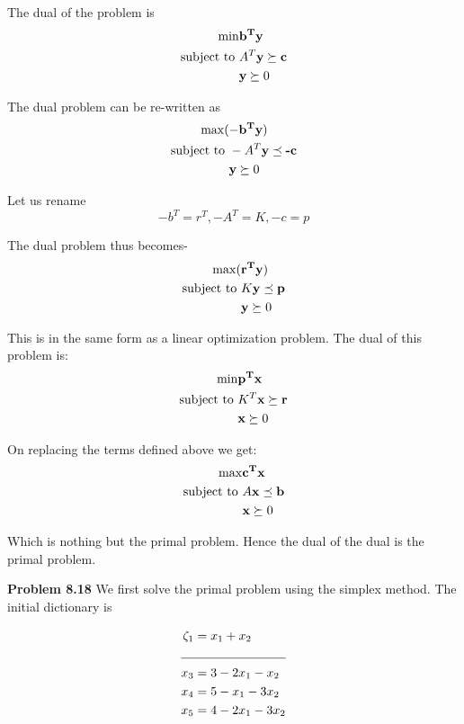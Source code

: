 \documentclass[letterpaper,12pt]{article}
\theoremstyle{definition}
\begin{document}
The dual of the problem is
\begin{align*}
\min &\mathbf{b^Ty} \\
\textnormal{subject to } &A^T\textbf{y}\succeq \textbf{c}\\
&\textbf{y} \succeq 0\\
\end{align*}

The dual problem can be re-written as
\begin{align*}
\max (&\mathbf{-b^Ty}) \\
\textnormal{subject to } &-A^T\textbf{y}\preceq \textbf{-c}\\
&\textbf{y} \succeq 0\\
\end{align*}

Let us rename $$-b^T=r^T, -A^T = K, -c = p$$

The dual problem thus becomes-
\begin{align*}
\max (&\mathbf{r^Ty}) \\
\textnormal{subject to } &K\textbf{y}\preceq \textbf{p}\\
&\textbf{y} \succeq 0\\
\end{align*}

This is in the same form as a linear optimization problem. The dual of this problem is:
\begin{align*}
\min &\mathbf{p^Tx} \\
\textnormal{subject to } &K^T\textbf{x}\succeq \textbf{r}\\
&\textbf{x} \succeq 0\\
\end{align*}

On replacing the terms defined above we get:
\begin{align*}
\max &\mathbf{c^Tx} \\
\textnormal{subject to } &A\textbf{x}\preceq \textbf{b}\\
&\textbf{x} \succeq 0\\
\end{align*}

Which is nothing but the primal problem. Hence the dual of the dual is the primal problem.

\vspace{3mm}
\noindent\textbf{Problem 8.18}
We first solve the primal problem using the simplex method. The initial dictionary is

\begin{align*}
  \zeta_1 &= x_1+x_2\\
  \cline{1-2}
  x_3 &= 3-2x_1-x_2\\
  x_4 &= 5-x_1-3x_2\\
  x_5 &= 4-2x_1-3x_2\\
\end{align*}
\end{document}
